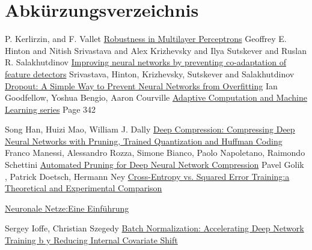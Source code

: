 \documentclass[12pt,a4paper]{scrartcl}
\numberwithin{equation}{section}
\begin{document}
\section{Abkürzungsverzeichnis}
\begin{acronym}[THIBAUT]
\end{acronym}

\begin{thebibliography}{lem00}
	P. Kerlirzin, and F. Vallet \href{ https://www.mitpressjournals.org/doi/abs/10.1162/neco.1993.5.3.473?journalCode=neco} {Robustness in Multilayer Perceptrons}
 	Geoffrey E. Hinton and Nitish Srivastava and Alex Krizhevsky and Ilya Sutskever and Ruslan R. Salakhutdinov \href{https://arxiv.org/abs/1207.0580}{Improving neural networks by preventing co-adaptation of feature detectors}
 	Srivastava, Hinton, Krizhevsky, Sutskever and Salakhutdinov \href{http://jmlr.org/papers/volume15/srivastava14a.old/srivastava14a.pdf}{Dropout: A Simple Way to Prevent Neural Networks from Overfitting}
Ian Goodfellow, Yoshua Bengio, Aaron Courville
\href{https://www.amazon.com/Deep-Learning-Adaptive-Computation-Machine/dp/0262035618/ref=as_li_ss_tl?ieTF8&qid=1548018253&sr=8-3&keywords=deep+learning&linkCode=sl1&tag=inspiredalgor-20&linkId=49b3b1cce7e04bb3c9b99f2d878bf805&language=en_US}{Adaptive Computation and Machine Learning series} Page 342
 
	 Song Han, Huizi Mao, William J. Dally \href{https://arxiv.org/abs/1510.00149}{Deep Compression: Compressing Deep Neural Networks with Pruning, Trained Quantization and Huffman Coding}
      Franco Manessi, Alessandro Rozza, Simone Bianco, Paolo Napoletano, Raimondo Schettini \href{https://arxiv.org/abs/1712.01721}{Automated Pruning for Deep Neural Network Compression}
 	 Pavel Golik , Patrick Doetsch, Hermann Ney
 	\href{http://books.jackon.me/Cross-Entropy-vs-Squared-Error-Training-a-Theoretical-and-Experimental-Comparison.pdf}{Cross-Entropy vs. Squared Error Training:a Theoretical and Experimental Comparison}
 	
 	\href{http://www.neuronalesnetz.de/aktivitaet.html}{Neuronale Netze:Eine Einführung}
 	
	Sergey Ioffe, Christian Szegedy
 	\href{https://arxiv.org/pdf/1502.03167.pdf}{Batch Normalization: Accelerating Deep Network Training b
 		y
 		Reducing Internal Covariate Shift}


\end{thebibliography}
\end{document}
